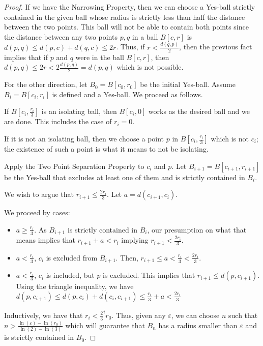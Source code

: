 \documentclass[12pt]{article}
\begin{document}
\begin{proof}

If we have the Narrowing Property, then we can choose a Yes-ball strictly contained in the given ball whose radius is strictly less than half the distance between the two points. This ball will not be able to contain both points since the distance between any two points $p, q$ in a ball $B[c, r]$ is $d(p,q) \leq d(p, c) + d(q,c) \leq 2r$. Thus, if $ r < \frac{d(q,p)}{2}$, then the previous fact implies that if $p$ and $q$ were in the ball $B[c, r]$, then $d(p,q) \leq 2 r < 2\frac{d(p,q)}{2} = d(p,q)$ which is not possible. 

For the other direction, let $B_0 = B[c_0, r_0]$ be the initial Yes-ball. Assume $B_i = B[c_i, r_i]$ is defined and a Yes-ball. We proceed as follows. 

If $B[c_i, \frac{r_i}{3}]$ is an isolating ball, then $B[c_i, 0]$ works as the desired ball and we are done. This includes the case of $r_i = 0$.

If it is not an isolating ball, then we choose a point $p$ in $B[c_i, \frac{r_i}{3}]$ which is not $c_i$; the existence of such a point is what it means to not be isolating.

Apply the Two Point Separation Property to $c_i$ and $p$. Let $B_{i+1} = B[c_{i+1}, r_{i+1}]$  be the Yes-ball that excludes at least one of them and is strictly contained in $B_i$.

We wish to argue that $r_{i +1} \leq \frac{2r_i}{3}$. Let $a = d(c_{i+1}, c_i)$. 

We proceed by cases: 

\begin{itemize}
    \item $a \geq \frac{r_i}{3}$.  As $B_{i+1}$ is strictly contained in $B_i$, our presumption on what that means implies that $r_{i+1} + a < r_i$ implying $ r_{i+1} < \frac{2 r_i}{3}$. 
    \item $a < \frac{r_i}{3}$, $c_i$ is excluded from $B_{i+1}$. Then, $r_{i+1} \leq a < \frac{r_i}{3} < \frac{2 r_i}{3}$. 
    \item $a < \frac{r_i}{3}$, $c_i$ is included, but $p$ is excluded. This implies that $r_{i+1} \leq d(p, c_{i+1})$. Using the triangle inequality, we have $d(p, c_{i+1}) \leq d(p, c_i) + d(c_i, c_{i+1}) \leq \frac{r_i}{3} + a < \frac{2r_i}{3}$ 
\end{itemize}

Inductively, we have that $r_i < \frac{2}{3}^i r_0$. Thus, given any $\varepsilon$, we can choose $n$ such that $n > \frac{\ln(\varepsilon) - \ln(r_0)}{\ln(2) - \ln(3)}$ which will guarantee that $B_n$ has a radius smaller than $\varepsilon$ and is strictly contained in $B_0$.
\end{proof}
\end{document}
